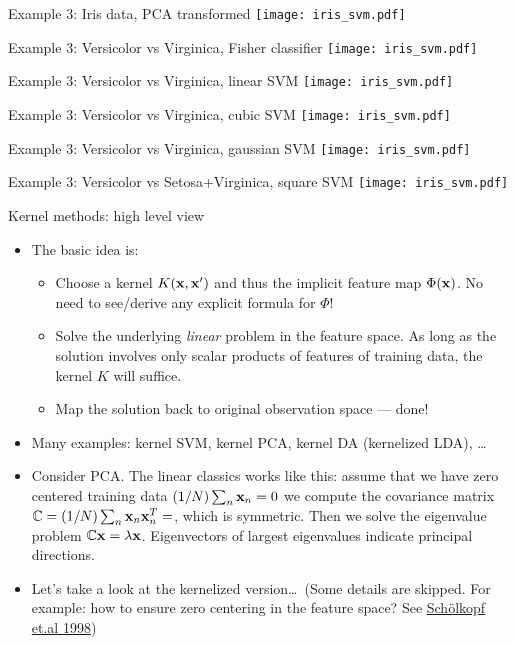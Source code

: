 \documentclass[handout]{beamer}   %
\def\C{\mathbb{C}}
\def\b#1{{\bf #1}}
\begin{document}
\begin{frame}{Example 3: Iris data, PCA transformed}
  \texttt{[image: iris\_svm.pdf]}
\end{frame}
\begin{frame}{Example 3: Versicolor vs Virginica, Fisher classifier}
  \texttt{[image: iris\_svm.pdf]}
\end{frame}
\begin{frame}{Example 3: Versicolor vs Virginica, linear SVM}
  \texttt{[image: iris\_svm.pdf]}
\end{frame}
\begin{frame}{Example 3: Versicolor vs Virginica, cubic SVM}
  \texttt{[image: iris\_svm.pdf]}
\end{frame}
\begin{frame}{Example 3: Versicolor vs Virginica, gaussian SVM}
  \texttt{[image: iris\_svm.pdf]}
\end{frame}
\begin{frame}{Example 3: Versicolor vs Setosa+Virginica, square SVM}
  \texttt{[image: iris\_svm.pdf]}
\end{frame}


\begin{frame}{Kernel methods: high level view}
  \begin{itemize}[<+->]
  \item The basic idea is:
    \begin{itemize}[<+->]
    \item Choose a kernel $K(\b x, \b x')$ and thus the implicit feature map
      $\Phi(\b x)$. No need to see/derive any explicit formula for $\Phi$!
    \item Solve the underlying {\it linear\/} problem in the feature space. As long as
      the solution involves only scalar products of features of training data,
      the kernel $K$ will suffice.
    \item Map the solution back to original observation space --- done!
    \end{itemize}
  \item Many examples: kernel SVM, kernel PCA, kernel DA (kernelized LDA), \dots
  \item Consider PCA. The linear classics works like this:
    assume that we have zero centered training data
    $(1/N)\sum_n {\b x}_n=0$ we compute the covariance matrix
    $\C=(1/N)\sum_n{\b x}_n{\b x}_n^T=$,
    which is symmetric. Then we solve the eigenvalue problem $\C{\b x}=\lambda{\b x}$.
    Eigenvectors of largest eigenvalues indicate principal directions.
  \item Let's take a look at the kernelized version\/\ldots\ (Some details are skipped.
    For example: how to ensure zero centering in the feature space? See
    \href{ftp://ftp.cfar.umd.edu/.snapshot/hourly.2/pub/aravinds/scholkopf98-kernel.pdf}%
         {Sch\"olkopf et.al 1998})
  \end{itemize}
\end{frame}
\end{document}
